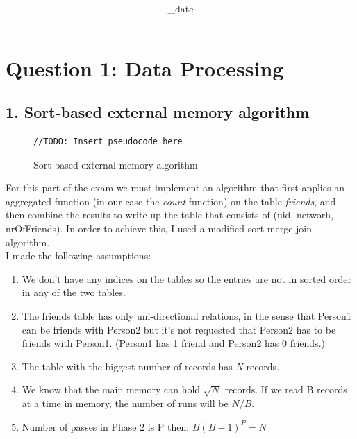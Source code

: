 \documentclass{article}      %
\title{\Course\\\Exam}
\author{\Studentname}
\date{\Sub_date}      %
\begin{document}

\maketitle                   %


\section*{Question 1: Data Processing} 

\subsection* {1. Sort-based external memory algorithm}

\begin{figure}[htbp]
\begin{center}
\begin{lstlisting}
//TODO: Insert pseudocode here
\end{lstlisting}
\caption{Sort-based external memory algorithm}
\label{Sort-based external memory algorithm}
\end{center}
\end{figure}

For this part of the exam we must implement an algorithm that first applies an aggregated function (in our case the \emph{count} function) on the table \emph{friends}, and then combine the results to write up the table that consists of (uid, networh, nrOfFriends). In order to achieve this, I used a modified sort-merge join algorithm.\\

I made the following assumptions:
\begin{enumerate}
\item
We don't have any indices on the tables so the entries are not in sorted order in any of the two tables.
\item  
The friends table has only uni-directional relations, in the sense that Person1 can be friends with Person2 but it's not requested that Person2 has to be friends with Person1. (Person1 has 1 friend and Person2 has 0 friends.)
\item
The table with the biggest number of records has \emph{N} records.
\item
We know that the main memory can hold \begin{math}\sqrt{N}\end{math} records. If we read B records at a time in memory, the number of runs will be \begin{math}N/B\end{math}.
\item 
Number of passes in Phase 2 is P then: \begin{math}B(B-1)^P = N\end{math}\\
 \end{enumerate}
\end{document}
